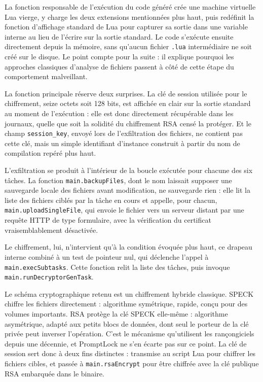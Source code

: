 La fonction responsable de l'exécution du code généré crée une machine virtuelle Lua vierge, y charge les deux extensions mentionnées plus haut, puis redéfinit la fonction d'affichage standard de Lua pour capturer sa sortie dans une variable interne au lieu de l'écrire sur la sortie standard. Le code s'exécute ensuite directement depuis la mémoire, sans qu'aucun fichier \texttt{.lua} intermédiaire ne soit créé sur le disque. Le point compte pour la suite : il explique pourquoi les approches classiques d'analyse de fichiers passent à côté de cette étape du comportement malveillant.

La fonction principale réserve deux surprises. La clé de session utilisée pour le chiffrement, seize octets soit 128 bits, est affichée en clair sur la sortie standard au moment de l'exécution : elle est donc directement récupérable dans les journaux, quelle que soit la solidité du chiffrement RSA censé la protéger. Et le champ \texttt{session\_key}, envoyé lors de l'exfiltration des fichiers, ne contient pas cette clé, mais un simple identifiant d'instance construit à partir du nom de compilation repéré plus haut.

L'exfiltration se produit à l'intérieur de la boucle exécutée pour chacune des six tâches. La fonction \texttt{main.backupFiles}, dont le nom laissait supposer une sauvegarde locale des fichiers avant modification, ne sauvegarde rien : elle lit la liste des fichiers ciblés par la tâche en cours et appelle, pour chacun, \texttt{main.uploadSingleFile}, qui envoie le fichier vers un serveur distant par une requête HTTP de type formulaire, avec la vérification du certificat vraisemblablement désactivée.

Le chiffrement, lui, n'intervient qu'à la condition évoquée plus haut, ce drapeau interne combiné à un test de pointeur nul, qui déclenche l'appel à \texttt{main.execSubtasks}. Cette fonction relit la liste des tâches, puis invoque \texttt{main.runDecryptorGenTask}.

Le schéma cryptographique retenu est un chiffrement hybride classique. SPECK chiffre les fichiers directement : algorithme symétrique, rapide, conçu pour des volumes importants. RSA protège la clé SPECK elle-même : algorithme asymétrique, adapté aux petits blocs de données, dont seul le porteur de la clé privée peut inverser l'opération. C'est le mécanisme qu'utilisent les rançongiciels depuis une décennie, et PromptLock ne s'en écarte pas sur ce point. La clé de session sert donc à deux fins distinctes : transmise au script Lua pour chiffrer les fichiers cibles, et passée à \texttt{main.rsaEncrypt} pour être chiffrée avec la clé publique RSA embarquée dans le binaire.

